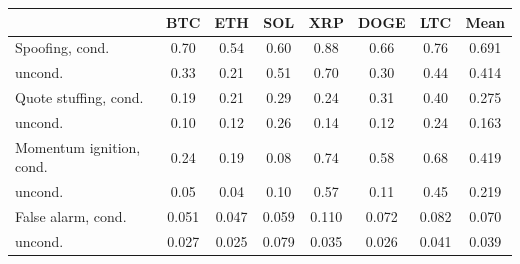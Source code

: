 \begin{tabular}{lccccccc}
\toprule
& BTC & ETH & SOL & XRP & DOGE & LTC & Mean \\
\midrule
Spoofing, cond. & 0.70 & 0.54 & 0.60 & 0.88 & 0.66 & 0.76 & 0.691 \\
\quad uncond. & 0.33 & 0.21 & 0.51 & 0.70 & 0.30 & 0.44 & 0.414 \\
Quote stuffing, cond. & 0.19 & 0.21 & 0.29 & 0.24 & 0.31 & 0.40 & 0.275 \\
\quad uncond. & 0.10 & 0.12 & 0.26 & 0.14 & 0.12 & 0.24 & 0.163 \\
Momentum ignition, cond. & 0.24 & 0.19 & 0.08 & 0.74 & 0.58 & 0.68 & 0.419 \\
\quad uncond. & 0.05 & 0.04 & 0.10 & 0.57 & 0.11 & 0.45 & 0.219 \\
\midrule
False alarm, cond. & 0.051 & 0.047 & 0.059 & 0.110 & 0.072 & 0.082 & 0.070 \\
\quad uncond. & 0.027 & 0.025 & 0.079 & 0.035 & 0.026 & 0.041 & 0.039 \\
\bottomrule
\end{tabular}
